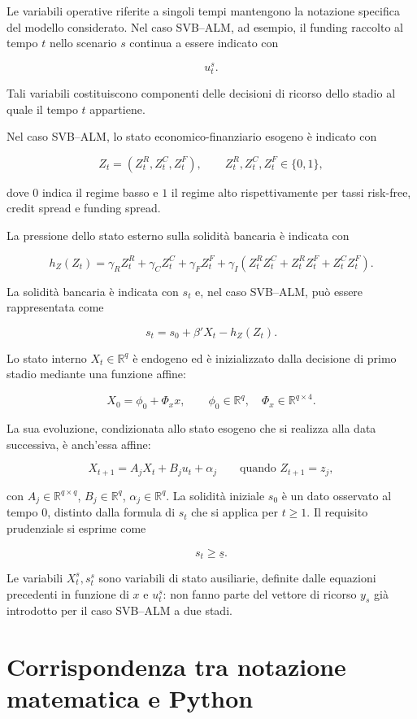 \documentclass[12pt,a4paper]{article}
\newcommand{\R}{\mathbb{R}}
\newcommand{\1}{\mathbf{1}}
\begin{document}
Le variabili operative riferite a singoli tempi mantengono la notazione
specifica del modello considerato. Nel caso SVB--ALM, ad esempio, il funding
raccolto al tempo $t$ nello scenario $s$ continua a essere indicato con

\[
u_t^s.
\]

Tali variabili costituiscono componenti delle decisioni di ricorso dello
stadio al quale il tempo $t$ appartiene.

Nel caso SVB--ALM, lo stato economico-finanziario esogeno \`e indicato con

\[
Z_t=(Z_t^R,Z_t^C,Z_t^F),
\qquad
Z_t^R,Z_t^C,Z_t^F\in\{0,1\},
\]

dove $0$ indica il regime basso e $1$ il regime alto rispettivamente per
tassi risk-free, credit spread e funding spread.

La pressione dello stato esterno sulla solidit\`a bancaria \`e indicata con

\[
h_Z(Z_t)
=
\gamma_R Z_t^R
+\gamma_C Z_t^C
+\gamma_F Z_t^F
+\gamma_I
\left(
Z_t^RZ_t^C
+Z_t^RZ_t^F
+Z_t^CZ_t^F
\right).
\]

La solidit\`a bancaria \`e indicata con $s_t$ e, nel caso SVB--ALM,
pu\`o essere rappresentata come

\[
s_t
=
s_0+\beta'X_t-h_Z(Z_t).
\]

Lo stato interno $X_t\in\R^q$ \`e endogeno ed \`e inizializzato dalla
decisione di primo stadio mediante una funzione affine:

\[
X_0=\phi_0+\Phi_xx,
\qquad
\phi_0\in\R^q,
\quad
\Phi_x\in\R^{q\times4}.
\]

La sua evoluzione, condizionata allo stato esogeno che si realizza alla
data successiva, \`e anch'essa affine:

\[
X_{t+1}=A_jX_t+B_ju_t+\alpha_j
\qquad
\text{quando } Z_{t+1}=z_j,
\]

con $A_j\in\R^{q\times q}$, $B_j\in\R^q$, $\alpha_j\in\R^q$. La solidit\`a
iniziale $s_0$ \`e un dato osservato al tempo $0$, distinto dalla
formula di $s_t$ che si applica per $t\geq1$. Il requisito prudenziale
si esprime come

\[
s_t\geq\underline s.
\]

Le variabili $X_t^s,s_t^s$ sono variabili di stato ausiliarie,
definite dalle equazioni precedenti in funzione di $x$ e $u_t^s$: non
fanno parte del vettore di ricorso $y_s$ gi\`a introdotto per il caso
SVB--ALM a due stadi.

\section{Corrispondenza tra notazione matematica e Python}
\end{document}
